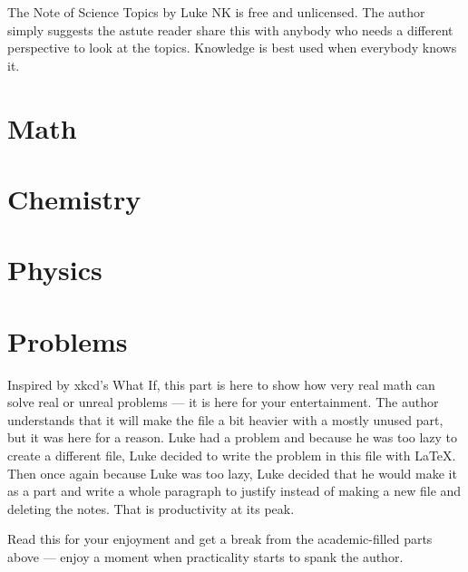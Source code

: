 \documentclass{report}
\begin{document}
\vspace*{\fill}

The Note of Science Topics by Luke NK is free and unlicensed. The author simply suggests the astute reader share this with anybody who needs a different perspective to look at the topics. Knowledge is best used when everybody knows it.

\part{Math}


\part{Chemistry}


\part{Physics}


\part{Problems}
Inspired by xkcd's What If, this part is here to show how very real math can solve real or unreal problems — it is here for your entertainment. The author understands that it will make the file a bit heavier with a mostly unused part, but it was here for a reason. Luke had a problem and because he was too lazy to create a different file, Luke decided to write the problem in this file with LaTeX. Then once again because Luke was too lazy, Luke decided that he would make it as a part and write a whole paragraph to justify instead of making a new file and deleting the notes. That is productivity at its peak.

Read this for your enjoyment and get a break from the academic-filled parts above — enjoy a moment when practicality starts to spank the author.
\end{document}
